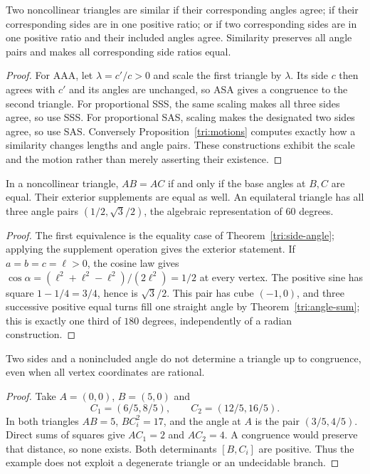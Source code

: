 \begin{theorem}
\label{tri:similarity}
Two noncollinear triangles are similar if their corresponding angles agree;
if their corresponding sides are in one positive ratio; or if two
corresponding sides are in one positive ratio and their included angles
agree.  Similarity preserves all angle pairs and makes all corresponding
side ratios equal.
\end{theorem}
\begin{proof}
For AAA, let $\lambda=c'/c>0$ and scale the first triangle by $\lambda$.
Its side $c$ then agrees with $c'$ and its angles are unchanged, so ASA
gives a congruence to the second triangle.  For proportional SSS, the
same scaling makes all three sides agree, so use SSS.  For proportional
SAS, scaling makes the designated two sides agree, so use SAS.
Conversely Proposition~\ref{tri:motions} computes exactly how a similarity
changes lengths and angle pairs.  These constructions exhibit the scale
and the motion rather than merely asserting their existence.
\end{proof}

\begin{theorem}
\label{tri:isosceles}
In a noncollinear triangle, $AB=AC$ if and only if the base angles at
$B,C$ are equal.  Their exterior supplements are equal as well.
An equilateral triangle has all three angle pairs
$(1/2,\sqrt3/2)$, the algebraic representation of $60$ degrees.
\end{theorem}
\begin{proof}
The first equivalence is the equality case of
Theorem~\ref{tri:side-angle}; applying the supplement operation gives the
exterior statement.  If $a=b=c=\ell>0$, the cosine law gives
$\cos\alpha=(\ell^2+\ell^2-\ell^2)/(2\ell^2)=1/2$ at every vertex.
The positive sine has square $1-1/4=3/4$, hence is $\sqrt3/2$.
This pair has cube $(-1,0)$, and three successive positive equal turns
fill one straight angle by Theorem~\ref{tri:angle-sum}; this is exactly
one third of $180$ degrees, independently of a radian construction.
\end{proof}

\begin{proposition}
\label{tri:ssa}
Two sides and a nonincluded angle do not determine a triangle up to
congruence, even when all vertex coordinates are rational.
\end{proposition}
\begin{proof}
Take $A=(0,0)$, $B=(5,0)$ and
\[
 C_1=(6/5,8/5),\qquad C_2=(12/5,16/5).
\]
In both triangles $AB=5$, $BC_i^2=17$, and the angle at $A$ is the pair
$(3/5,4/5)$.  Direct sums of squares give
$AC_1=2$ and $AC_2=4$.  A congruence would preserve that distance, so none
exists.  Both determinants $[B,C_i]$ are positive.  Thus the example does
not exploit a degenerate triangle or an undecidable branch.
\end{proof}

